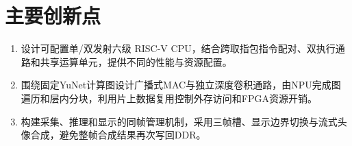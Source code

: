 \section{主要创新点}
\begin{enumerate}[label=\arabic*.]
    \item 设计可配置单/双发射六级 RISC-V CPU，结合跨取指包指令配对、双执行通路和共享运算单元，提供不同的性能与资源配置。
    \item 围绕固定YuNet计算图设计广播式MAC与独立深度卷积通路，由NPU完成图遍历和层内分块，利用片上数据复用控制外存访问和FPGA资源开销。
    \item 构建采集、推理和显示的同帧管理机制，采用三帧槽、显示边界切换与流式头像合成，避免整帧合成结果再次写回DDR。
\end{enumerate}
